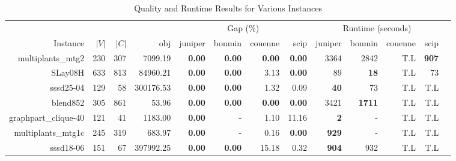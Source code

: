\begin{landscape} 
\begin{table*}[t] 
\footnotesize 
\caption{Quality and Runtime Results for Various Instances} 
\begin{tabular}{|r|r|r||r||r|r|r|r||r|r|r|r|r|} 
\hline 
                        &     &       &             & \multicolumn{4}{c||}{Gap (\%)} &  \multicolumn{4}{c|}{Runtime (seconds)} \\ 
    Instance              & $|V|$& $|C|$& obj         & juniper    & bonmin & couenne        & scip            & juniper          & bonmin            & couenne         & scip \\ 
    \hline 
    \hline 
                   multiplants\_mtg2 &           230 &           307 &                           7099.19 &  \textbf{0.00} &  \textbf{0.00} &  \textbf{0.00} &  \textbf{0.00} &               3364 &               2842 &                T.L &       \textbf{907} \\ 
                             SLay08H &           633 &           813 &                          84960.21 &  \textbf{0.00} &  \textbf{0.00} &           3.13 &  \textbf{0.00} &                 89 &        \textbf{18} &                T.L &                 73 \\ 
                           sssd25-04 &           129 &            58 &                         300176.53 &  \textbf{0.00} &  \textbf{0.00} &           1.32 &           0.09 &        \textbf{40} &                 73 &                T.L &                T.L \\ 
                            blend852 &           305 &           861 &                             53.96 &  \textbf{0.00} &  \textbf{0.00} &  \textbf{0.00} &  \textbf{0.00} &               3421 &      \textbf{1711} &                T.L &                T.L \\ 
                graphpart\_clique-40 &           121 &            41 &                           1183.00 &  \textbf{0.00} &              - &           1.10 &          11.16 &         \textbf{2} &                  - &                T.L &                T.L \\ 
                  multiplants\_mtg1c &           245 &           319 &                            683.97 &  \textbf{0.00} &              - &           0.16 &  \textbf{0.00} &       \textbf{929} &                  - &                T.L &                T.L \\ 
                           sssd18-06 &           151 &            67 &                         397992.25 &  \textbf{0.00} &  \textbf{0.00} &          15.18 &           0.32 &       \textbf{904} &                932 &                T.L &                T.L \\ 

\end{tabular}
\end{table*}
\end{landscape}
